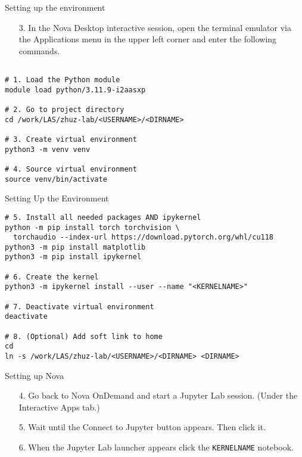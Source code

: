 \documentclass{beamer} %
\begin{document}
\begin{frame}[containsverbatim]{Setting up the environment}
  \begin{itemize}
    \item[3.] In the Nova Desktop interactive session, open the terminal
      emulator via the Applications menu in the upper left corner and enter the
      following commands.
  \end{itemize}
  \begin{verbatim}

# 1. Load the Python module
module load python/3.11.9-i2aasxp

# 2. Go to project directory
cd /work/LAS/zhuz-lab/<USERNAME>/<DIRNAME>

# 3. Create virtual environment 
python3 -m venv venv

# 4. Source virtual environment
source venv/bin/activate
\end{verbatim}
\end{frame}

\begin{frame}[containsverbatim]{Setting Up the Environment}
  \begin{verbatim}
# 5. Install all needed packages AND ipykernel
python -m pip install torch torchvision \ 
  torchaudio --index-url https://download.pytorch.org/whl/cu118
python3 -m pip install matplotlib
python3 -m pip install ipykernel

# 6. Create the kernel
python3 -m ipykernel install --user --name "<KERNELNAME>"

# 7. Deactivate virtual environment
deactivate

# 8. (Optional) Add soft link to home
cd
ln -s /work/LAS/zhuz-lab/<USERNAME>/<DIRNAME> <DIRNAME>
\end{verbatim}
\end{frame}

\begin{frame}[containsverbatim]{Setting up Nova}
  \begin{itemize}
    \item[4.] Go back to Nova OnDemand and start a Jupyter Lab session. (Under the
      Interactive Apps tab.)
    \item[5.] Wait until the Connect to Jupyter button appears. Then click it.
    \item[6.] When the Jupyter Lab launcher appears click the
      \verb|KERNELNAME| notebook.
  \end{itemize}
\end{frame}
\end{document}
